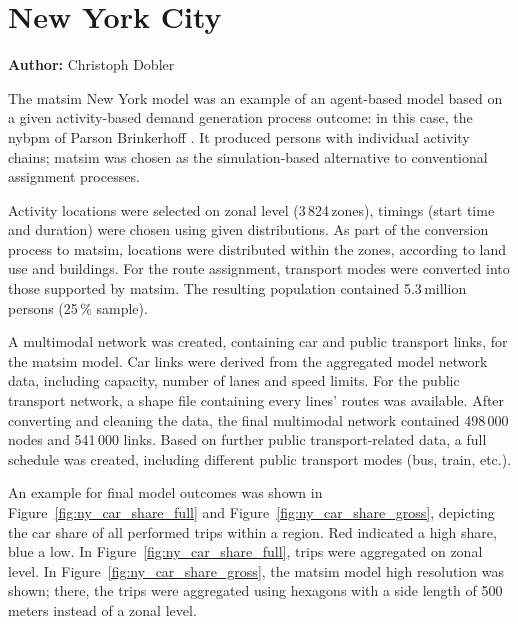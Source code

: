 \chapter{New York City}
\label{ch:nyc}
\hfill \textbf{Author:} Christoph Dobler


The \gls{matsim} New York model was an example of an agent-based model based on a given activity-based demand generation process outcome: in this case, the \gls{nybpm} of Parson Brinkerhoff \citep[][]{VovshaEtAl_TRR_2002, ParsonsBrinckerhoff_ResRep_NYBPM_2005, ParsonsBrinckerhoff_ResRep_NYBPM_2009}. It produced persons with individual activity chains; \gls{matsim} was chosen as the simulation-based alternative to conventional assignment processes.

Activity locations were selected on zonal level (3\,824\,zones), timings (\ie start time and duration) were chosen using given distributions. As part of the conversion process to \gls{matsim}, locations were distributed within the zones, according to land use and buildings. For the route assignment, transport modes were converted into those supported by \gls{matsim}. The resulting population contained 5.3\,million persons (25\,\% sample).

A \gls{multimodal} network was created, containing car and public transport links, for the \gls{matsim} model. Car links were derived from the aggregated model network data, including capacity, number of lanes and speed limits. For the public transport network, a shape file containing every lines' routes was available. After converting and cleaning the data, the final \gls{multimodal} network contained 498\,000 nodes and 541\,000 links. Based on further public transport-related data, a full schedule was created, including different public transport modes (bus, train, etc.).

An example for final model outcomes was shown in Figure~\ref{fig:ny_car_share_full} and Figure~\ref{fig:ny_car_share_gross}, depicting the car share of all performed trips within a region. Red indicated a high share, blue a low. In Figure~\ref{fig:ny_car_share_full}, trips were aggregated on zonal level. In Figure~\ref{fig:ny_car_share_gross}, the \gls{matsim} model high resolution was shown; there, the trips were aggregated using hexagons with a side length of 500\,meters instead of a zonal level.

